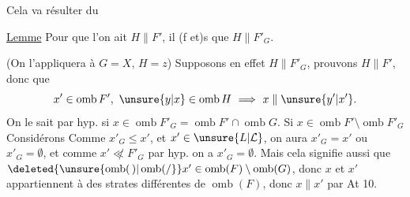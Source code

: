  Cela va résulter du

\uline{Lemme} \quad {}
Pour que  l'on ait $H\parallel F'$, il (f et)s que $H\parallel F'_G$.

(On l'appliquera à $G=X$, $H=z$) Supposons en effet $H\parallel F'_G$, prouvons $H\parallel F'$, donc que 
\[
x'\in\operatorname{omb} F',\ \unsure{y|x}\in\operatorname{omb} H\ \Longrightarrow\ x\parallel \unsure{y'|x'}.
\]
On le sait par hyp. si $x\in\operatorname{omb} F'_G=\operatorname{omb} F'\cap\operatorname{omb} G$. Si $x\in\operatorname{omb} F'\setminus\operatorname{omb} F'_G$
Considérons
Comme $x'_G\leq x'$, et $x'\in\unsure{L|\mathcal L}$, on aura $x'_G=x'$ ou $x'_G=\emptyset$, et comme $x'\not\ll F'_G$ par hyp. on a $x'_G=\emptyset$. Mais cela signifie aussi que $\deleted{\unsure{\operatorname{omb}(\,)|\operatorname{omb}(/}}x'\in\operatorname{omb}(F)\setminus\operatorname{omb}(G)$, donc $x$ et $x'$ appartiennent à des strates  différentes de $\operatorname{omb}(F)$, donc $x\parallel x'$ par At 10.

